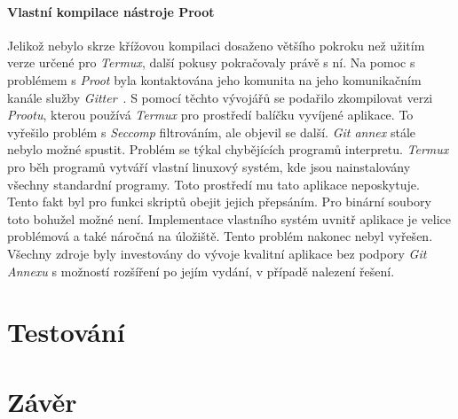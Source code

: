     \subsubsection{Vlastní kompilace nástroje Proot}
    Jelikož nebylo skrze křížovou kompilaci dosaženo většího pokroku než užitím verze určené pro \emph{Termux}, další pokusy pokračovaly právě s ní. Na pomoc s problémem s \emph{Proot} byla kontaktována jeho komunita na jeho komunikačním kanále služby \emph{Gitter}~. S pomocí těchto vývojářů se podařilo zkompilovat verzi \emph{Prootu}, kterou používá \emph{Termux} pro prostředí balíčku vyvíjené aplikace. To vyřešilo problém s \emph{Seccomp} filtrováním, ale objevil se další. \emph{Git annex} stále nebylo možné spustit. Problém se týkal chybějících programů interpretu. \emph{Termux} pro běh programů vytváří vlastní linuxový systém, kde jsou nainstalovány všechny standardní programy. Toto prostředí mu tato aplikace neposkytuje. Tento fakt byl pro funkci skriptů obejit jejich přepsáním. Pro binární soubory toto bohužel možné není. Implementace vlastního systém uvnitř aplikace je velice problémová a také náročná na úložiště. Tento problém nakonec nebyl vyřešen. Všechny zdroje byly investovány do vývoje kvalitní aplikace bez podpory \emph{Git Annexu} s možností rozšíření po jejím vydání, v případě nalezení řešení.

\chapter{Testování}
\chapter{Závěr}